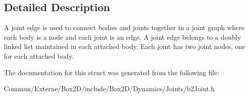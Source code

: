 \subsection{Detailed Description}
A joint edge is used to connect bodies and joints together in a joint graph where each body is a node and each joint is an edge. A joint edge belongs to a doubly linked list maintained in each attached body. Each joint has two joint nodes, one for each attached body. 

The documentation for this struct was generated from the following file\+:\begin{DoxyCompactItemize}
\item 
Commun/\+Externe/\+Box2\+D/include/\+Box2\+D/\+Dynamics/\+Joints/b2\+Joint.\+h\end{DoxyCompactItemize}
